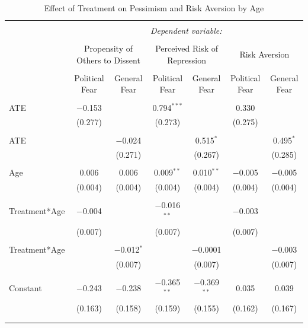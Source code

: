 \documentclass{article}
\begin{document}
\begin{landscape}
\setlength{\tabcolsep}{0.3pt}
\begin{table}[!htbp] \centering 
  \caption{Effect of Treatment on Pessimism and Risk Aversion by Age} 
  \label{} 
\begin{tabular}{@{\extracolsep{5pt}}lcccccc} 
\\[-1.8ex]\hline 
\hline \\[-1.8ex] 
 & \multicolumn{6}{c}{\textit{Dependent variable:}} \\ 
\cline{2-7} 
\\[-1.8ex] & \multicolumn{2}{c}{Propensity of Others to Dissent} & \multicolumn{2}{c}{Perceived Risk of Repression} & \multicolumn{2}{c}{Risk Aversion} \\ 
\\[-1.8ex] & Political Fear & General Fear & Political Fear & General Fear & Political Fear & General Fear\\ 
\hline \\[-1.8ex] 
 ATE & $-$0.153 &  & 0.794$^{***}$ &  & 0.330 &  \\ 
  & (0.277) &  & (0.273) &  & (0.275) &  \\ 
  & & & & & & \\ 
 ATE &  & $-$0.024 &  & 0.515$^{*}$ &  & 0.495$^{*}$ \\ 
  &  & (0.271) &  & (0.267) &  & (0.285) \\ 
  & & & & & & \\ 
 Age & 0.006 & 0.006 & 0.009$^{**}$ & 0.010$^{**}$ & $-$0.005 & $-$0.005 \\ 
  & (0.004) & (0.004) & (0.004) & (0.004) & (0.004) & (0.004) \\ 
  & & & & & & \\ 
 Treatment*Age & $-$0.004 &  & $-$0.016$^{**}$ &  & $-$0.003 &  \\ 
  & (0.007) &  & (0.007) &  & (0.007) &  \\ 
  & & & & & & \\ 
 Treatment*Age &  & $-$0.012$^{*}$ &  & $-$0.0001 &  & $-$0.003 \\ 
  &  & (0.007) &  & (0.007) &  & (0.007) \\ 
  & & & & & & \\ 
 Constant & $-$0.243 & $-$0.238 & $-$0.365$^{**}$ & $-$0.369$^{**}$ & 0.035 & 0.039 \\ 
  & (0.163) & (0.158) & (0.159) & (0.155) & (0.162) & (0.167) \\ 
  & & & & & & \\ 
\hline \\[-1.8ex] 

\end{tabular}
\end{table}
\end{landscape}
\end{document}
